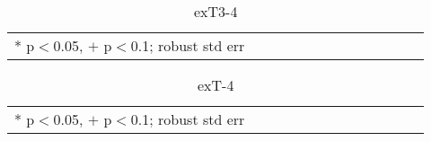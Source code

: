 \documentclass[11pt, letterpaper]{article}
\begin{document}
\begin{spacing}{1.4}
\begin{spacing}{.9} \begin{table}[H]\centering  \label{exT3-4} \begin{scriptsize} \begin{tabular}{p{1.0in}p{.5in}p{.5in}p{.5in}p{.5in}p{.5in}p{.5in}p{.5in}p{.5in}p{.5in}p{.5 in}p{.5in}p{.5 in}}\hline  \hline   * p$<$0.05, $+$ p$<$0.1; robust std err \end{tabular}\end{scriptsize}\caption{exT3-4}\end{table} \end{spacing}

\begin{spacing}{.9} \begin{table}[H]\centering  \label{exT-4} \begin{scriptsize} \begin{tabular}{p{1.0in}p{.5in}p{.5in}p{.5in}p{.5in}p{.5in}p{.5in}p{.5in}p{.5in}p{.5in}p{.5 in}p{.5in}p{.5 in}}\hline  \hline   * p$<$0.05, $+$ p$<$0.1; robust std err \end{tabular}\end{scriptsize}\caption{exT-4}\end{table} \end{spacing}







\end{spacing}
\end{document}
